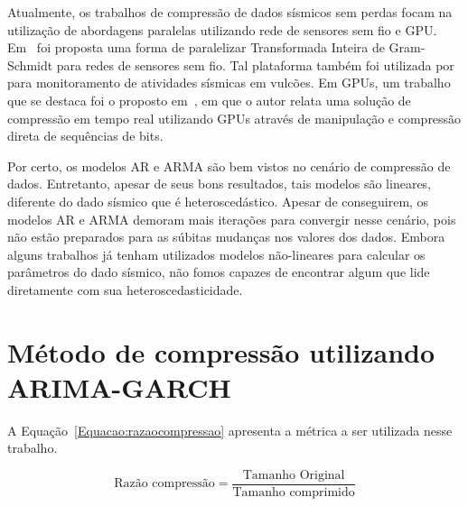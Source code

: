 Atualmente, os trabalhos de compressão de dados sísmicos sem perdas focam na
utilização de abordagens paralelas utilizando rede de sensores sem fio e GPU.
Em~\citep{Artigo:transformadainteiro} foi proposta uma forma de paralelizar
Transformada Inteira de Gram-Schmidt para redes de sensores sem fio. Tal
plataforma também foi utilizada por~\citep{Artigo:volcano} para monitoramento de
atividades sísmicas em vulcões. Em GPUs, um trabalho que se destaca foi o
proposto em~\citep{Artigo:gpurealtime}, em que o autor relata uma
solução de compressão em tempo real utilizando GPUs através de manipulação e
compressão direta de sequências de bits.

Por certo, os modelos AR e ARMA são bem vistos no cenário de compressão de
dados. Entretanto, apesar de seus bons resultados, tais modelos são lineares,
diferente do dado sísmico que é heteroscedástico. Apesar de conseguirem, os
modelos AR e ARMA demoram mais iterações para convergir nesse cenário, pois não
estão preparados para as súbitas mudanças nos valores dos dados. Embora alguns
trabalhos já tenham utilizados modelos não-lineares para calcular os parâmetros
do dado sísmico, não fomos capazes de encontrar algum que lide diretamente com
sua heteroscedasticidade.

\section{Método de compressão utilizando ARIMA-GARCH}

A Equação~\ref{Equacao:razaocompressao} apresenta a métrica a ser utilizada
nesse trabalho.

\begin{equation}
\text{Razão compressão} = \frac{\text{Tamanho Original}}{\text{Tamanho
comprimido}}
\label{Equacao:razaocompressao}
\end{equation}




